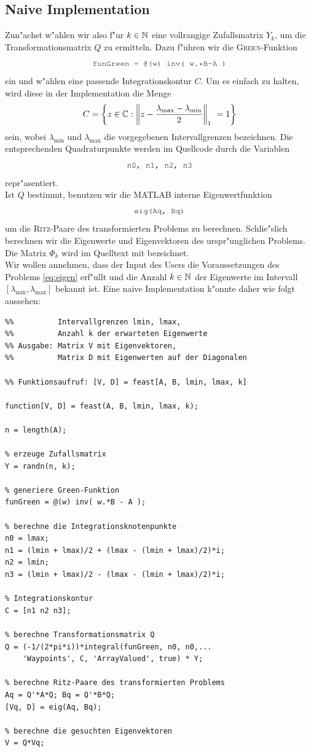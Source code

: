 \subsection{Naive Implementation}
Zun"achst w"ahlen wir also f"ur $k\in\mathbb{N}$ eine vollrangige Zufallsmatrix $Y_k$, um
die Transformationsmatrix $Q$ zu ermitteln. Dazu f"uhren wir die \textsc{Green}-Funktion
\[
\mcode{funGreen = @(w) inv( w.*B-A )}
\]
ein und w"ahlen eine passende Integrationskontur
$C$. Um es einfach zu halten, wird diese in der Implementation die Menge
\[
C = \left\{ z \in \mathbb{C} : \left\lVert z - \frac{\lambda_\text{max} -
\lambda_\text{min}}{2} \right\rVert_1\ = 1\right\}
\]
sein, wobei $\lambda_\text{min}$ und $\lambda_\text{max}$ die vorgegebenen Intervallgrenzen
bezeichnen. Die entsprechenden Quadraturpunkte werden im Quellcode durch die
Variablen
\[
\mcode{n0, n1, n2, n3}
\]
repr"asentiert.\\

Ist $Q$ bestimmt, benutzen wir die MATLAB interne Eigenwertfunktion
\[
\mcode{eig(Aq, Bq)}
\]
um die \textsc{Ritz}-Paare des transformierten Problems zu berechnen. Schlie"slich
berechnen wir die Eigenwerte und Eigenvektoren des urspr"unglichen Problems.
Die Matrix $\Phi_k$ wird im Quelltext mit   bezeichnet.\\

Wir wollen annehmen, dass der Input des Users die Voraussetzungen des
Problems \eqref{eq:eigen} erf"ullt und die Anzahl $k\in\mathbb{N}$ der Eigenwerte
im Intervall $[\lambda_\text{min}, \lambda_\text{max}]$ bekannt ist.
Eine naive Implementation k"onnte daher wie folgt aussehen:

\begin{lstlisting}[caption=Naive FEAST Implementation., captionpos=b]
%% Eingabe: Matrizen A, B des Eigenwertproblems,
%%          Intervallgrenzen lmin, lmax,
%%	        Anzahl k der erwarteten Eigenwerte
%% Ausgabe: Matrix V mit Eigenvektoren,
%%          Matrix D mit Eigenwerten auf der Diagonalen

%% Funktionsaufruf: [V, D] = feast[A, B, lmin, lmax, k]

function[V, D] = feast(A, B, lmin, lmax, k);

n = length(A);

% erzeuge Zufallsmatrix
Y = randn(n, k);

% generiere Green-Funktion
funGreen = @(w) inv( w.*B - A );

% berechne die Integrationsknotenpunkte
n0 = lmax;
n1 = (lmin + lmax)/2 + (lmax - (lmin + lmax)/2)*i;
n2 = lmin;
n3 = (lmin + lmax)/2 - (lmax - (lmin + lmax)/2)*i;

% Integrationskontur
C = [n1 n2 n3];

% berechne Transformationsmatrix Q
Q = (-1/(2*pi*i))*integral(funGreen, n0, n0,...
	'Waypoints', C, 'ArrayValued', true) * Y;

% berechne Ritz-Paare des transformierten Problems
Aq = Q'*A*Q; Bq = Q'*B*Q;
[Vq, D] = eig(Aq, Bq);

% berechne die gesuchten Eigenvektoren
V = Q*Vq;
\end{lstlisting}

